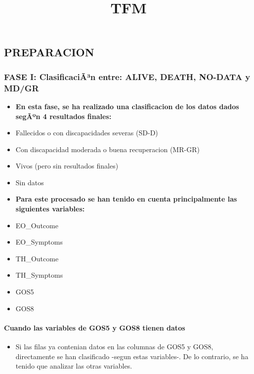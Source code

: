 \documentclass[]{article}
\title{TFM}
\author{}
\date{}
\providecommand{\tightlist}{%
  \setlength{\itemsep}{0pt}\setlength{\parskip}{0pt}}
\let\oldparagraph\paragraph
\renewcommand{\paragraph}[1]{\oldparagraph{#1}\mbox{}}
\begin{document}
\maketitle

\subsection{PREPARACION}\label{preparacion}

\subsubsection{FASE I: ClasificaciÃ³n entre: ALIVE, DEATH, NO-DATA y
MD/GR}\label{fase-i-clasificacian-entre-alive-death-no-data-y-mdgr}

\begin{itemize}
\item
  \textbf{En esta fase, se ha realizado una clasificacion de los datos
  dados segÃºn 4 resultados finales:}
\item
  Fallecidos o con discapacidades severas (SD-D)
\item
  Con discapacidad moderada o buena recuperacion (MR-GR)
\item
  Vivos (pero sin resultados finales)
\item
  Sin datos
\item
  \textbf{Para este procesado se han tenido en cuenta principalmente las
  siguientes variables:}
\item
  EO\_Outcome
\item
  EO\_Symptoms
\item
  TH\_Outcome
\item
  TH\_Symptoms
\item
  GOS5
\item
  GOS8
\end{itemize}

\paragraph{\texorpdfstring{Cuando las variables de GOS5 y GOS8
\textbf{tienen}
datos}{Cuando las variables de GOS5 y GOS8 tienen datos}}\label{cuando-las-variables-de-gos5-y-gos8-tienen-datos}

\begin{itemize}
\tightlist
\item
  Si las filas ya contenian datos en las columnas de GOS5 y GOS8,
  directamente se han clasificado -segun estas variables-. De lo
  contrario, se ha tenido que analizar las otras variables.
\end{itemize}
\end{document}
